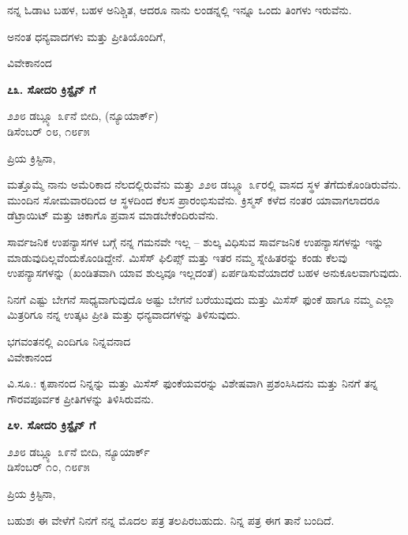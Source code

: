 ನನ್ನ ಓಡಾಟ ಬಹಳ, ಬಹಳ ಅನಿಶ್ಚಿತ, ಆದರೂ ನಾನು ಲಂಡನ್ನಲ್ಲಿ ಇನ್ನೂ ಒಂದು ತಿಂಗಳು ಇರುವೆನು.

ಅನಂತ ಧನ್ಯವಾದಗಳು ಮತ್ತು ಪ್ರೀತಿಯೊಂದಿಗೆ,

\begin{flushright}
ವಿವೇಕಾನಂದ
\end{flushright}

\begin{center}
\textbf{೭೩. ಸೋದರಿ ಕ್ರಿಸ್ಟೈನ್ ಗೆ}
\end{center}

\begin{flushright}
೨೨೮ ಡಬ್ಲ್ಯೂ ೩೯ನೆ ಬೀದಿ, (ನ್ಯೂಯಾರ್ಕ್)\\ಡಿಸೆಂಬರ್ ೦೮, ೧೮೯೫
\end{flushright}

ಪ್ರಿಯ ಕ್ರಿಸ್ಟಿನಾ,

ಮತ್ತೊಮ್ಮೆ ನಾನು ಅಮೆರಿಕಾದ ನೆಲದಲ್ಲಿರುವೆನು ಮತ್ತು ೨೨೮ ಡಬ್ಲ್ಯೂ ೩೯ರಲ್ಲಿ ವಾಸದ ಸ್ಥಳ ತೆಗೆದುಕೊಂಡಿರುವೆನು. ಮುಂದಿನ ಸೋಮವಾರದಿಂದ ಆ ಸ್ಥಳದಿಂದ ಕೆಲಸ ಪ್ರಾರಂಭಿಸುವೆನು. ಕ್ರಿಸ್ಮಸ್ ಕಳೆದ ನಂತರ ಯಾವಾಗಲಾದರೂ ಡೆಟ್ರಾಯಿಟ್ ಮತ್ತು ಚಿಕಾಗೊ ಪ್ರವಾಸ ಮಾಡಬೇಕೆಂದಿರುವೆನು.

ಸಾರ್ವಜನಿಕ ಉಪನ್ಯಾಸಗಳ ಬಗ್ಗೆ ನನ್ನ ಗಮನವೇ ಇಲ್ಲ – ಶುಲ್ಕ ವಿಧಿಸುವ ಸಾರ್ವಜನಿಕ ಉಪನ್ಯಾಸಗಳನ್ನು ಇನ್ನು ಮಾಡುವುದಿಲ್ಲವೆಂದುಕೊಂಡಿದ್ದೇನೆ. ಮಿಸೆಸ್ ಫಿಲಿಪ್ಸ್ ಮತ್ತು ಇತರ ನಮ್ಮ ಸ್ನೇಹಿತರನ್ನು ಕಂಡು ಕೆಲವು ಉಪನ್ಯಾಸಗಳನ್ನು (ಖಂಡಿತವಾಗಿ ಯಾವ ಶುಲ್ಕವೂ ಇಲ್ಲದಂತೆ) ಏರ್ಪಡಿಸುವೆಯಾದರೆ ಬಹಳ ಅನುಕೂಲವಾಗುವುದು.

ನಿನಗೆ ಎಷ್ಟು ಬೇಗನೆ ಸಾಧ್ಯವಾಗುವುದೊ ಅಷ್ಟು ಬೇಗನೆ ಬರೆಯುವುದು ಮತ್ತು ಮಿಸೆಸ್ ಫುಂಕೆ ಹಾಗೂ ನಮ್ಮ ಎಲ್ಲಾ ಮಿತ್ರರಿಗೂ ನನ್ನ ಉತ್ಕಟ ಪ್ರೀತಿ ಮತ್ತು ಧನ್ಯವಾದಗಳನ್ನು ತಿಳಿಸುವುದು.

\begin{flushright}
ಭಗವಂತನಲ್ಲಿ ಎಂದಿಗೂ ನಿನ್ನವನಾದ\\ವಿವೇಕಾನಂದ
\end{flushright}

ವಿ.ಸೂ.: ಕೃಪಾನಂದ ನಿನ್ನನ್ನು ಮತ್ತು ಮಿಸೆಸ್ ಫುಂಕೆಯವರನ್ನು ವಿಶೇಷವಾಗಿ ಪ್ರಶಂಸಿಸಿದನು ಮತ್ತು ನಿನಗೆ ತನ್ನ ಗೌರವಪೂರ್ವಕ ಪ್ರೀತಿಗಳನ್ನು ತಿಳಿಸಿರುವನು.

\begin{center}
\textbf{೭೪. ಸೋದರಿ ಕ್ರಿಸ್ಟೈನ್ ಗೆ}
\end{center}

\begin{flushright}
೨೨೮ ಡಬ್ಲ್ಯೂ ೩೯ನೆ ಬೀದಿ, ನ್ಯೂಯಾರ್ಕ್\\ಡಿಸೆಂಬರ್ ೧೦, ೧೮೯೫
\end{flushright}

ಪ್ರಿಯ ಕ್ರಿಸ್ಟಿನಾ,

ಬಹುಶಃ ಈ ವೇಳೆಗೆ ನಿನಗೆ ನನ್ನ ಮೊದಲ ಪತ್ರ ತಲಪಿರಬಹುದು. ನಿನ್ನ ಪತ್ರ ಈಗ ತಾನೆ ಬಂದಿದೆ.

